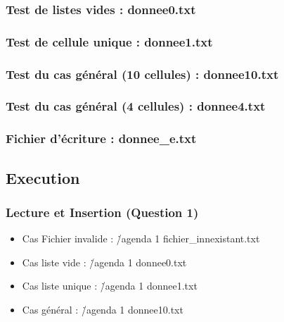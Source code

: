 \documentclass{report}
\begin{document}
\subsubsection{Test de listes vides : donnee0.txt}


\subsubsection{Test de cellule unique : donnee1.txt}


\subsubsection{Test du cas général (10 cellules) : donnee10.txt}


\subsubsection{Test du cas général (4 cellules) : donnee4.txt}


\subsubsection{Fichier d'écriture : donnee\_e.txt}

\newpage
\subsection{Execution}
\subsubsection{Lecture et Insertion (Question 1)}
\begin{itemize}
    \item Cas Fichier invalide : \./agenda 1 fichier\_innexistant.txt
\vspace{0.5cm}

\vspace{0.5cm}

    \item Cas liste vide : \./agenda 1 donnee0.txt
\vspace{0.5cm}

\vspace{0.5cm}

    \item Cas liste unique : \./agenda 1 donnee1.txt
\vspace{0.5cm}

\vspace{0.5cm}

    \item Cas général : \./agenda 1 donnee10.txt
\vspace{0.5cm}

\end{itemize}
\end{document}

